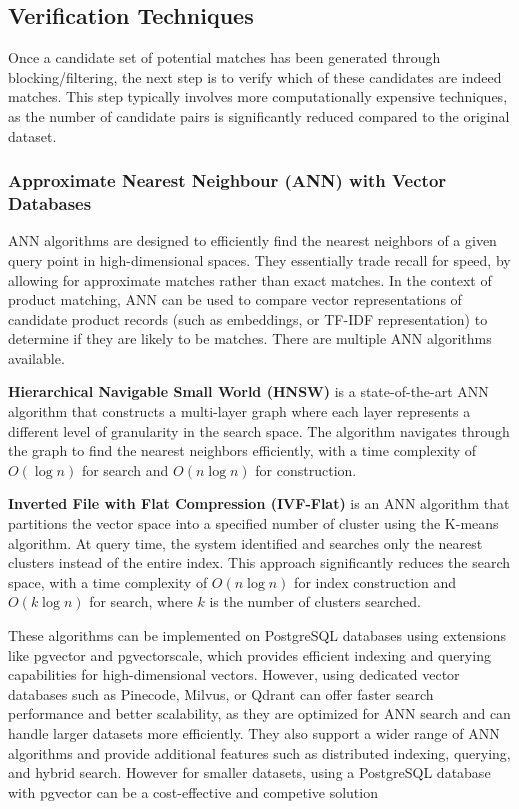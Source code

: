 \subsection{Verification Techniques}\label{subsec:verification_techniques}

Once a candidate set of potential matches has been generated through blocking/filtering, the next step is to verify which of these candidates are indeed matches.
This step typically involves more computationally expensive techniques, as the number of candidate pairs is significantly reduced compared to the original dataset.

\subsubsection{Approximate Nearest Neighbour (ANN) with Vector Databases}\label{subsubsec:ann}

ANN algorithms are designed to efficiently find the nearest neighbors of a given query point in high-dimensional spaces.
They essentially trade recall for speed, by allowing for approximate matches rather than exact matches.
In the context of product matching, ANN can be used to compare vector representations of candidate product records (such as embeddings, or TF-IDF representation) to determine if they are likely to be matches.
There are multiple ANN algorithms available.

\textbf{Hierarchical Navigable Small World (HNSW)} is a state-of-the-art ANN algorithm that constructs a multi-layer graph where each layer represents a different level of granularity in the search space.
The algorithm navigates through the graph to find the nearest neighbors efficiently, with a time complexity of $O(\log n)$ for search and $O(n \log n)$ for construction.\cite{malkov2018efficient}

\textbf{Inverted File with Flat Compression (IVF-Flat)} is an ANN algorithm that partitions the vector space into a specified number of cluster using the K-means algorithm.
At query time, the system identified and searches only the nearest clusters instead of the entire index.
This approach significantly reduces the search space, with a time complexity of $O(n \log n)$ for index construction and $O(k \log n)$ for search, where $k$ is the number of clusters searched.\cite{InstaclustrPgvector2025}

These algorithms can be implemented on PostgreSQL databases using extensions like pgvector\cite{InstaclustrPgvector2025} and pgvectorscale, which provides efficient indexing and querying capabilities for high-dimensional vectors.\cite{FirecrawlBestVectorDBs2026}
However, using dedicated vector databases such as Pinecode, Milvus, or Qdrant can offer faster search performance and better scalability, as they are optimized for ANN search and can handle larger datasets more efficiently.
They also support a wider range of ANN algorithms and provide additional features such as distributed indexing, querying, and hybrid search.\cite{EncorePgvectorVsQdrant2026}
However for smaller datasets, using a PostgreSQL database with pgvector can be a cost-effective and competive solution\cite{ImranZaman2026VectorBenchmark}

